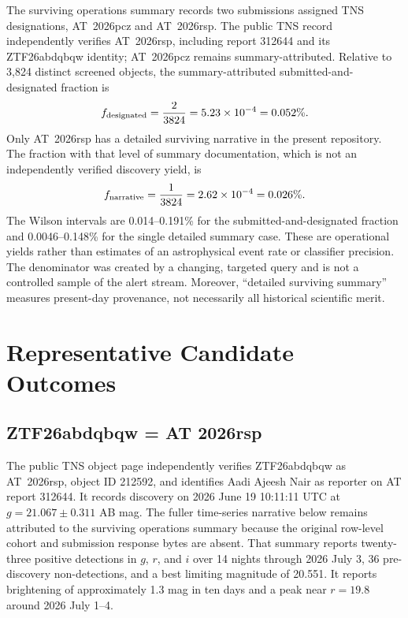 \documentclass[11pt]{article}
\begin{document}
The surviving operations summary records two submissions assigned TNS designations, AT~2026pcz and AT~2026rsp. The public TNS record independently verifies AT~2026rsp, including report 312644 and its ZTF26abdqbqw identity; AT~2026pcz remains summary-attributed. Relative to 3,824 distinct screened objects, the summary-attributed submitted-and-designated fraction is
\begin{equation}
  f_{\rm designated} = \frac{2}{3824} = 5.23\times10^{-4} = 0.052\%.
\end{equation}
Only AT~2026rsp has a detailed surviving narrative in the present repository. The fraction with that level of summary documentation, which is not an independently verified discovery yield, is
\begin{equation}
  f_{\rm narrative} = \frac{1}{3824} = 2.62\times10^{-4} = 0.026\%.
\end{equation}
The Wilson intervals are 0.014--0.191\% for the submitted-and-designated fraction and 0.0046--0.148\% for the single detailed summary case. These are operational yields rather than estimates of an astrophysical event rate or classifier precision. The denominator was created by a changing, targeted query and is not a controlled sample of the alert stream. Moreover, ``detailed surviving summary'' measures present-day provenance, not necessarily all historical scientific merit.

\section{Representative Candidate Outcomes}
\label{sec:cases}

\subsection{ZTF26abdqbqw = AT 2026rsp}

The public TNS object page independently verifies ZTF26abdqbqw as AT~2026rsp, object ID 212592, and identifies Aadi Ajeesh Nair as reporter on AT report 312644. It records discovery on 2026 June 19 10:11:11 UTC at $g=21.067\pm0.311$ AB mag. The fuller time-series narrative below remains attributed to the surviving operations summary because the original row-level cohort and submission response bytes are absent. That summary reports twenty-three positive detections in $g$, $r$, and $i$ over 14 nights through 2026 July 3, 36 pre-discovery non-detections, and a best limiting magnitude of 20.551. It reports brightening of approximately 1.3 mag in ten days and a peak near $r=19.8$ around 2026 July 1--4.
\end{document}
